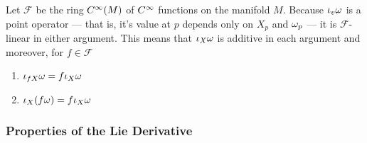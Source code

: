 Let \(\mathcal{F}\) be the ring \(C^\infty(M)\) of \(C^\infty\) functions on the manifold \(M\).
Because \(\iota_v \omega\) is a point operator --- that is, it's value at \(p\) depends only on \(X_p\) and \(\omega_p\) --- it is \(\mathcal{F}\)-linear in either argument. 
This means that \(\iota_X \omega\) is additive in each argument and moreover, for \(f \in \mathcal{F}\)
\begin{enumerate}
    \item \(\iota_{f X} \omega = f \iota_X \omega\)  
    \item \(\iota_X (f \omega) = f \iota_X \omega\)
\end{enumerate}

\subsubsection{Properties of the Lie Derivative}

